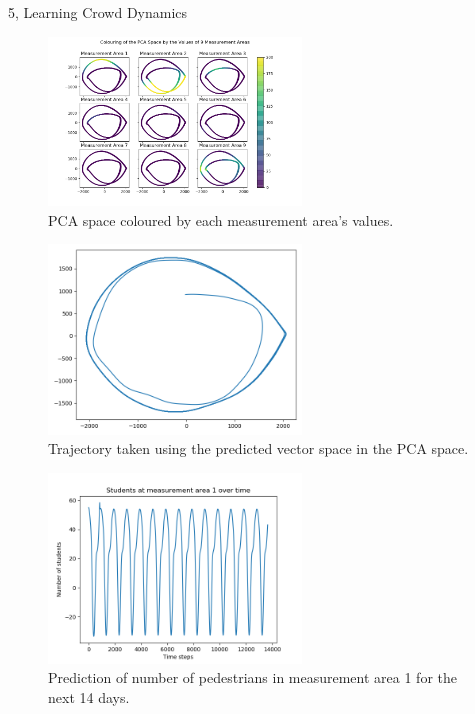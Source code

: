 \documentclass[10pt,a4paper]{article}
\begin{document}
\begin{task}{5, Learning Crowd Dynamics}
\begin{enumerate}
\end{enumerate}

\begin{figure}[H]
\centering
\includegraphics[width=0.6\textwidth]{../plots/task5_2.png}
\caption{PCA space coloured by each measurement area's values.}
\label{fig:task5_2}
\end{figure}

\begin{figure}[H]
\centering
\includegraphics[width=0.6\textwidth]{../plots/task5_3.png}
\caption{Trajectory taken using the predicted vector space in the PCA space.}
\label{fig:task5_3}
\end{figure}

\begin{figure}[H]
\centering
\includegraphics[width=0.6\textwidth]{../plots/task5_4_alternative.png}
\caption{Prediction of number of pedestrians in measurement area 1 for the next 14 days.}
\label{fig:task5_4_1}
\end{figure}


\end{task}
\end{document}
